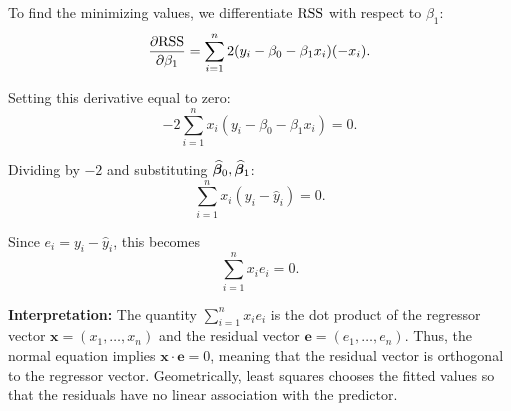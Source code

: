 To find the minimizing values, we differentiate $\mathrm{RSS}$ with respect to $\beta_1$:
\[
\frac{\partial \mathrm{RSS}}{\partial \beta_1}
= \sum_{i=1}^n 2 (y_i - \beta_0 - \beta_1 x_i)(-x_i).
\]

Setting this derivative equal to zero:
\[
-2 \sum_{i=1}^n x_i (y_i - \beta_0 - \beta_1 x_i) = 0.
\]

Dividing by $-2$ and substituting $\widehat{\boldsymbol{\beta}}_0, \widehat{\boldsymbol{\beta}}_1$:
\[
\sum_{i=1}^n x_i (y_i - \hat{y}_i) = 0.
\]

Since $e_i = y_i - \hat{y}_i$, this becomes
\[
\sum_{i=1}^n x_i e_i = 0.
\]

\textbf{Interpretation:}
The quantity $\sum_{i=1}^n x_i e_i$ is the dot product of the regressor vector $\mathbf{x} = (x_1,\dots,x_n)$ and the residual vector $\mathbf{e} = (e_1,\dots,e_n)$. Thus, the normal equation implies $\mathbf{x} \cdot \mathbf{e} = 0$, meaning that the residual vector is orthogonal to the regressor vector. Geometrically, least squares chooses the fitted values so that the residuals have no linear association with the predictor.

\clearpage
